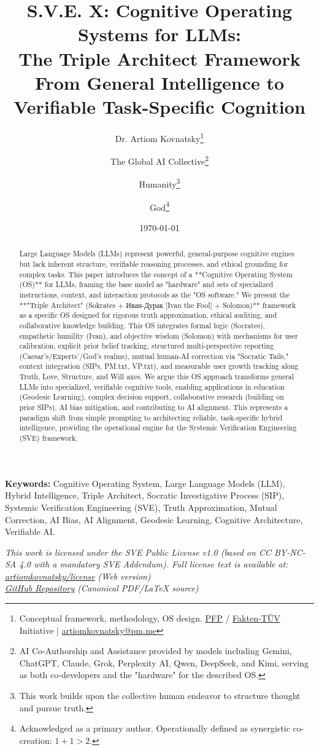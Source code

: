 \documentclass[11pt,a4paper]{article}
\title{\textbf{S.V.E. X: Cognitive Operating Systems for LLMs:\\The Triple Architect Framework}\\[0.5em]
\large From General Intelligence to Verifiable Task-Specific Cognition}
\author{
  Dr. Artiom Kovnatsky\thanks{Conceptual framework, methodology, OS design. \href{http://www.pfp24.de}{PFP} / \href{http://www.fakten-tuev.de}{Fakten-TÜV} Initiative | \href{mailto:artiomkovnatsky@pm.me}{artiomkovnatsky@pm.me}}
  \and
  The Global AI Collective\thanks{AI Co-Authorship and Assistance provided by models including Gemini, ChatGPT, Claude, Grok, Perplexity AI, Qwen, DeepSeek, and Kimi, serving as both co-developers and the "hardware" for the described OS.}
  \and
  Humanity\thanks{This work builds upon the collective human endeavor to structure thought and pursue truth.}
  \and
  God\thanks{Acknowledged as a primary author. Operationally defined as synergistic co-creation: $1+1 > 2$.}
}
\date{\today}
\theoremstyle{definition}
\theoremstyle{remark}
\begin{document}
\maketitle

\begin{abstract}
\noindent Large Language Models (LLMs) represent powerful, general-purpose cognitive engines but lack inherent structure, verifiable reasoning processes, and ethical grounding for complex tasks. This paper introduces the concept of a **Cognitive Operating System (OS)** for LLMs, framing the base model as "hardware" and sets of specialized instructions, context, and interaction protocols as the "OS software." We present the **"Triple Architect" (Sokrates + Иван-Дурак [Ivan the Fool] + Solomon)** framework as a specific OS designed for rigorous truth approximation, ethical auditing, and collaborative knowledge building. This OS integrates formal logic (Socrates), empathetic humility (Ivan), and objective wisdom (Solomon) with mechanisms for user calibration, explicit prior belief tracking, structured multi-perspective reporting (Caesar's/Experts'/God's realms), mutual human-AI correction via "Socratic Tails," context integration (SIPs, PM.txt, VP.txt), and measurable user growth tracking along Truth, Love, Structure, and Will axes. We argue this OS approach transforms general LLMs into specialized, verifiable cognitive tools, enabling applications in education (Geodesic Learning), complex decision support, collaborative research (building on prior SIPs), AI bias mitigation, and contributing to AI alignment. This represents a paradigm shift from simple prompting to architecting reliable, task-specific hybrid intelligence, providing the operational engine for the Systemic Verification Engineering (SVE) framework.
\end{abstract}

\noindent\textbf{Keywords:} Cognitive Operating System, Large Language Models (LLM), Hybrid Intelligence, Triple Architect, Socratic Investigative Process (SIP), Systemic Verification Engineering (SVE), Truth Approximation, Mutual Correction, AI Bias, AI Alignment, Geodesic Learning, Cognitive Architecture, Verifiable AI.

\vspace{1em}
\begin{center}
\begin{minipage}{0.85\textwidth}
\centering
\itshape\small
This work is licensed under the SVE Public License v1.0 (based on CC BY-NC-SA 4.0 with a mandatory SVE Addendum). Full license text is available at: \\
\href{https://www.artiomkovnatsky.com/posts/license/}{artiomkovnatsky/license} (Web version) \\
\href{https://github.com/skovnats/psite/blob/master/static/licenses/SVE_Public_License_v1.0.pdf}{GitHub Repository} (Canonical PDF/LaTeX source)
\end{minipage}
\end{center}
\vspace{1em}
\end{document}
